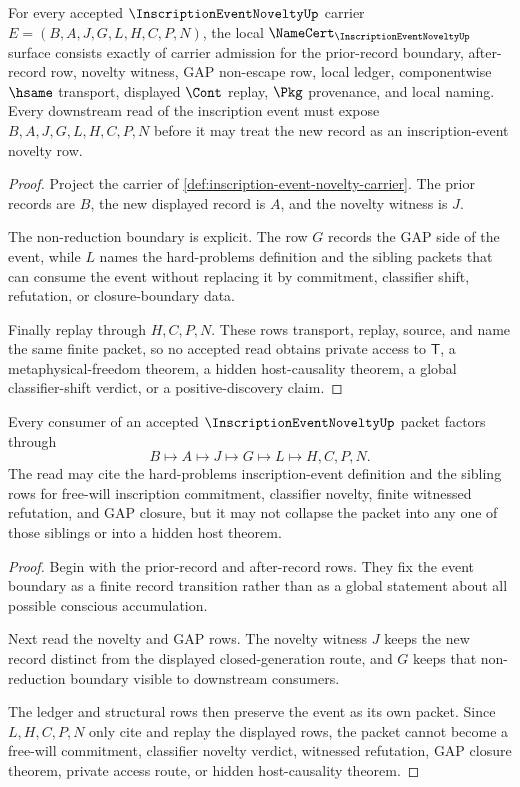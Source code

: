 \begin{theorem}
\label{thm:inscription-event-novelty-namecert-obligations}
For every accepted $\InscriptionEventNoveltyUp$ carrier $E=(B,A,J,G,L,H,C,P,N)$, the local $\NameCert_{\InscriptionEventNoveltyUp}$ surface consists exactly of carrier admission for the prior-record boundary, after-record row, novelty witness, GAP non-escape row, local ledger, componentwise $\hsame$ transport, displayed $\Cont$ replay, $\Pkg$ provenance, and local naming. Every downstream read of the inscription event must expose $B,A,J,G,L,H,C,P,N$ before it may treat the new record as an inscription-event novelty row.
\end{theorem}
\begin{proof}
Project the carrier of \autoref{def:inscription-event-novelty-carrier}. The prior records are $B$, the new displayed record is $A$, and the novelty witness is $J$.

The non-reduction boundary is explicit. The row $G$ records the GAP side of the event, while $L$ names the hard-problems definition and the sibling packets that can consume the event without replacing it by commitment, classifier shift, refutation, or closure-boundary data.

Finally replay through $H,C,P,N$. These rows transport, replay, source, and name the same finite packet, so no accepted read obtains private access to $\mathsf{T}$, a metaphysical-freedom theorem, a hidden host-causality theorem, a global classifier-shift verdict, or a positive-discovery claim.
\end{proof}

\begin{theorem}
\label{thm:inscription-event-novelty-nonescape}
Every consumer of an accepted $\InscriptionEventNoveltyUp$ packet factors through
$$
B \longmapsto A \longmapsto J \longmapsto G \longmapsto L \longmapsto H,C,P,N .
$$
The read may cite the hard-problems inscription-event definition and the sibling rows for free-will inscription commitment, classifier novelty, finite witnessed refutation, and GAP closure, but it may not collapse the packet into any one of those siblings or into a hidden host theorem.
\end{theorem}
\begin{proof}
Begin with the prior-record and after-record rows. They fix the event boundary as a finite record transition rather than as a global statement about all possible conscious accumulation.

Next read the novelty and GAP rows. The novelty witness $J$ keeps the new record distinct from the displayed closed-generation route, and $G$ keeps that non-reduction boundary visible to downstream consumers.

The ledger and structural rows then preserve the event as its own packet. Since $L,H,C,P,N$ only cite and replay the displayed rows, the packet cannot become a free-will commitment, classifier novelty verdict, witnessed refutation, GAP closure theorem, private access route, or hidden host-causality theorem.
\end{proof}

